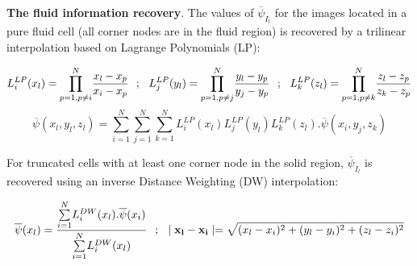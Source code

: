 {\bf The fluid information recovery}. The values of $\overline{\psi}_{I_l}$ for the images located in a pure fluid cell (all corner nodes are in the fluid region) is recovered by a trilinear interpolation based on Lagrange Polynomials (LP):

\vspace{-0.25cm}
\begin{equation}
	L^{LP}_i(x_l)=\overset{N}{\underset{p=1,p \neq i}{\prod}}\frac{x_l-x_p}{x_i-x_p} \hspace{0.25cm} ; \hspace{0.25cm}
	L^{LP}_j(y_l)=\overset{N}{\underset{p=1,p \neq j}{\prod}}\frac{y_l-y_p}{y_j-y_p} \hspace{0.25cm} ; \hspace{0.25cm}
	L^{LP}_k(z_l)=\overset{N}{\underset{p=1,p \neq k}{\prod}}\frac{z_l-z_p}{z_k-z_p} \\
\end{equation}	
\vspace{-0.25cm}
\vspace{-0.25cm}
\begin{equation}
	\overline{\psi}(x_l,y_l,z_l)= \overset{N}{\underset{i=1}{\sum}} \overset{N}{\underset{j=1}{\sum}}  
	                   \overset{N}{\underset{k=1}{\sum}}L^{LP}_i(x_l)L^{LP}_j(y_l)L^{LP}_k(z_l).\overline{\psi}(x_i,y_j,z_k) 
\end{equation}
\vspace{-0.25cm}

For truncated cells with at least one corner node in the solid region, $\overline{\psi}_{I_l}$ is recovered using an inverse Distance Weighting (DW) interpolation:

\vspace{-0.25cm}
\begin{equation}
	\overline{\psi}(x_l)=\frac{\overset{N}{\underset{i=1}{\sum}}L^{DW}_i(x_l).\overline{\psi}(x_i)}{\overset{N}{\underset{i=1}{\sum}}L^{DW}_i(x_l)} \hspace{0.25cm} ; \hspace{0.25cm}
	\mid {\bf x_l}-{\bf x_i} \mid=\sqrt{(x_l-x_i)^2+(y_l-y_i)^2+(z_l-z_i)^2}
	\label{E_ID}
\end{equation}
\vspace{-0.25cm}

